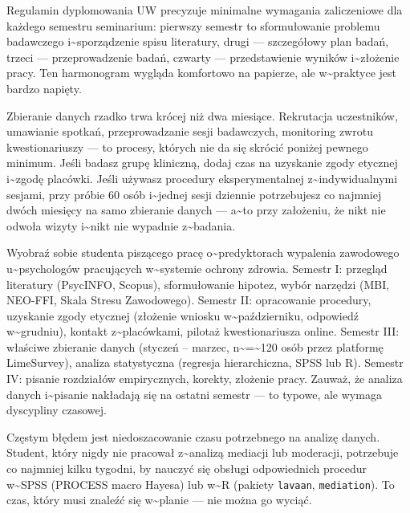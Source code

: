 \documentclass[12pt,a4paper,twoside,openany]{book}
\begin{document}
Regulamin dyplomowania UW precyzuje minimalne wymagania zaliczeniowe dla każdego semestru seminarium: pierwszy semestr to sformułowanie problemu badawczego i\textasciitilde{}sporządzenie spisu literatury, drugi --- szczegółowy plan badań, trzeci --- przeprowadzenie badań, czwarty --- przedstawienie wyników i\textasciitilde{}złożenie pracy. Ten harmonogram wygląda komfortowo na papierze, ale w\textasciitilde{}praktyce jest bardzo napięty.


Zbieranie danych rzadko trwa krócej niż dwa miesiące. Rekrutacja uczestników, umawianie spotkań, przeprowadzanie sesji badawczych, monitoring zwrotu kwestionariuszy --- to procesy, których nie da się skrócić poniżej pewnego minimum. Jeśli badasz grupę kliniczną, dodaj czas na uzyskanie zgody etycznej i\textasciitilde{}zgodę placówki. Jeśli używasz procedury eksperymentalnej z\textasciitilde{}indywidualnymi sesjami, przy próbie 60 osób i\textasciitilde{}jednej sesji dziennie potrzebujesz co najmniej dwóch miesięcy na samo zbieranie danych --- a\textasciitilde{}to przy założeniu, że nikt nie odwoła wizyty i\textasciitilde{}nikt nie wypadnie z\textasciitilde{}badania.


\begin{examplebox} Wyobraź sobie studenta piszącego pracę o\textasciitilde{}predyktorach wypalenia zawodowego u\textasciitilde{}psychologów pracujących w\textasciitilde{}systemie ochrony zdrowia. Semestr I: przegląd literatury (PsycINFO, Scopus), sformułowanie hipotez, wybór narzędzi (MBI, NEO-FFI, Skala Stresu Zawodowego). Semestr II: opracowanie procedury, uzyskanie zgody etycznej (złożenie wniosku w\textasciitilde{}październiku, odpowiedź w\textasciitilde{}grudniu), kontakt z\textasciitilde{}placówkami, pilotaż kwestionariusza online. Semestr III: właściwe zbieranie danych (styczeń -- marzec, n\textasciitilde{}=\textasciitilde{}120 osób przez platformę LimeSurvey), analiza statystyczna (regresja hierarchiczna, SPSS lub R). Semestr IV: pisanie rozdziałów empirycznych, korekty, złożenie pracy. Zauważ, że analiza danych i\textasciitilde{}pisanie nakładają się na ostatni semestr --- to typowe, ale wymaga dyscypliny czasowej.
\end{examplebox}


Częstym błędem jest niedoszacowanie czasu potrzebnego na analizę danych. Student, który nigdy nie pracował z\textasciitilde{}analizą mediacji lub moderacji, potrzebuje co najmniej kilku tygodni, by nauczyć się obsługi odpowiednich procedur w\textasciitilde{}SPSS (PROCESS macro Hayesa) lub w\textasciitilde{}R (pakiety \texttt{lavaan}, \texttt{mediation}). To czas, który musi znaleźć się w\textasciitilde{}planie --- nie można go wyciąć.
\end{document}
